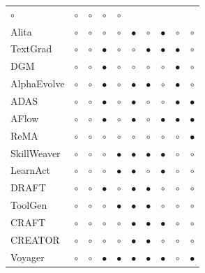 \begin{table}[!t]
{\begin{tabular}{@{}l cc cc ccc cc@{}}
\(\circ\) & \(\circ\) & \(\circ\) & \(\circ\) & \(\circ\) \\
Alita\citep{qiu2025alita} & \(\circ\) & \(\circ\) & \(\circ\) & \(\circ\) &
\(\bullet\) & \(\circ\) & \(\bullet\) & \(\circ\) & \(\circ\) \\
TextGrad\citep{yellamraju2024textgrad} & \(\circ\) & \(\circ\) & \(\bullet\) & \(\circ\) &
\(\circ\) & \(\bullet\) & \(\bullet\) & \(\bullet\) & \(\circ\) \\
DGM\citep{zhang2025darwin} & \(\circ\) & \(\circ\) & \(\bullet\) & \(\circ\) &
\(\circ\) & \(\circ\) & \(\circ\) & \(\bullet\) & \(\circ\) \\
AlphaEvolve\citep{novikov2025alphaevolve} & \(\circ\) & \(\circ\) & \(\bullet\)  & \(\circ\) &
\(\bullet\)  & \(\bullet\)  & \(\circ\) & \(\bullet\) & \(\circ\) \\
ADAS\citep{hu2024automated} & \(\circ\) & \(\circ\) & \(\bullet\)& \(\circ\) &
\(\bullet\) & \(\circ\) & \(\circ\) & \(\bullet\) & \(\bullet\) \\
AFlow\citep{zhang2024aflow} & \(\circ\) & \(\circ\) & \(\bullet\)& \(\circ\) &
\(\bullet\) & \(\circ\) & \(\bullet\) & \(\bullet\) & \(\bullet\) \\
ReMA\citep{wan2025remalearningmetathinkllms} & \(\circ\) & \(\circ\) & \(\circ\) & \(\circ\) &
\(\circ\) & \(\circ\) & \(\circ\) & \(\circ\) & \(\bullet\) \\
SkillWeaver\citep{zheng2025skillweaver} & \(\circ\) & \(\circ\) & \(\circ\) & \(\bullet\) &
\(\bullet\) & \(\bullet\) & \(\bullet\) & \(\circ\) & \(\circ\) \\
LearnAct\citep{zhao2024learnact} & \(\circ\) & \(\circ\) & \(\circ\) & \(\bullet\) &
\(\bullet\) & \(\circ\) & \(\bullet\) & \(\circ\) & \(\circ\) \\
DRAFT\citep{fromexplorationtomastery} & \(\circ\) & \(\circ\) & \(\bullet\) & \(\circ\) &
\(\bullet\) & \(\bullet\) & \(\circ\) & \(\circ\) & \(\circ\) \\
ToolGen\citep{wang2025toolgen} & \(\circ\) & \(\circ\) & \(\circ\) & \(\bullet\) &
\(\bullet\)& \(\bullet\) & \(\circ\) & \(\circ\) & \(\circ\) \\
CRAFT\citep{yuan2024craft} & \(\circ\) & \(\circ\) & \(\circ\) & \(\circ\) &
\(\bullet\) & \(\bullet\) & \(\bullet\) & \(\circ\) & \(\circ\) \\
CREATOR\citep{qian2023creator} & \(\circ\) & \(\circ\) & \(\circ\) & \(\circ\) &
\(\bullet\) & \(\bullet\) & \(\circ\) & \(\circ\) & \(\circ\) \\
Voyager\citep{wang2023voyager} & \(\circ\) & \(\circ\) & \(\bullet\) & \(\bullet\) &
\(\bullet\) & \(\bullet\) & \(\bullet\) & \(\circ\) & \(\bullet\) \\
\bottomrule
\end{tabular}}
\end{table}

